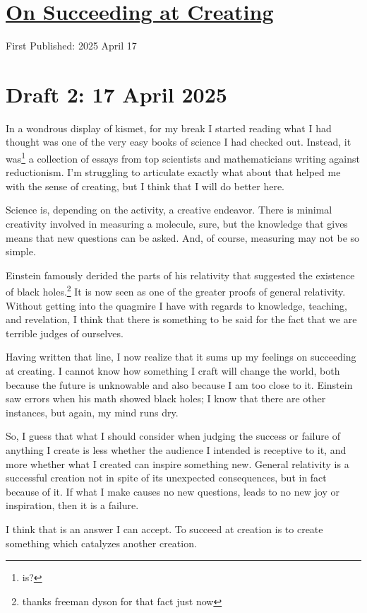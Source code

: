 \documentclass[12pt]{article}
\renewcommand{\,}{\textsuperscript{,}}
\begin{document}
  
\doublespacing  
\section{\href{succeeding-at-creating.html}{On Succeeding at Creating}}  
First Published: 2025 April 17

\section{Draft 2: 17 April 2025}  
In a wondrous display of kismet, for my break I started reading what I had thought was one of the very easy books of science I had checked out.  
Instead, it was\footnote{is?} a collection of essays from top scientists and mathematicians writing against reductionism.  
I'm struggling to articulate exactly what about that helped me with the sense of creating, but I think that I will do better here.

Science is, depending on the activity, a creative endeavor.  
There is minimal creativity involved in measuring a molecule, sure, but the knowledge that gives means that new questions can be asked.  
And, of course, measuring may not be so simple.

Einstein famously derided the parts of his relativity that suggested the existence of black holes.\footnote{thanks freeman dyson for that fact just now}  
It is now seen as one of the greater proofs of general relativity.  
Without getting into the quagmire I have with regards to knowledge, teaching, and revelation, I think that there is something to be said for the fact that we are terrible judges of ourselves.

Having written that line, I now realize that it sums up my feelings on succeeding at creating.  
I cannot know how something I craft will change the world, both because the future is unknowable and also because I am too close to it.  
Einstein saw errors when his math showed black holes; I know that there are other instances, but again, my mind runs dry.

So, I guess that what I should consider when judging the success or failure of anything I create is less whether the audience I intended is receptive to it, and more whether what I created can inspire something new.  
General relativity is a successful creation not in spite of its unexpected consequences, but in fact because of it.  
If what I make causes no new questions, leads to no new joy or inspiration, then it is a failure.

I think that is an answer I can accept.  
To succeed at creation is to create something which catalyzes another creation.
\end{document}
